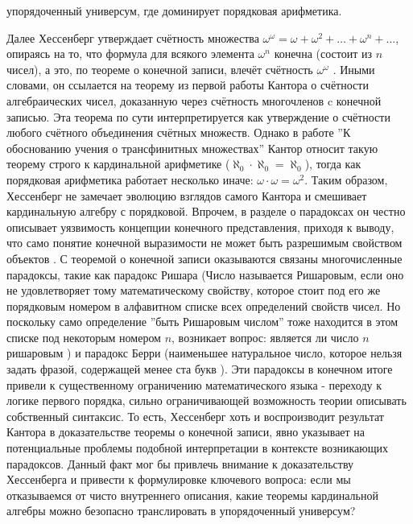 \documentclass[12pt]{article}
\begin{document}
упорядоченный универсум, где доминирует порядковая арифметика.

Далее Хессенберг утверждает счётность множества $\omega^{\omega} = \omega + \omega^2 + \dots + \omega^n + \dots$, опираясь на то, что формула для всякого элемента $\omega^n$ конечна (состоит из $n$ чисел), а это, по теореме о конечной записи, влечёт счётность $\omega^\omega$  \cite{hessenberg-countable-exponent}. Иными словами, он ссылается на теорему из первой работы Кантора о счётности алгебраических чисел, доказанную через счётность многочленов c конечной записью. Эта теорема по сути интерпретируется как утверждение о счётности любого счётного объединения счётных множеств. Однако в работе ''К обоснованию учения о трансфинитных множествах'' Кантор относит такую теорему строго к кардинальной арифметике ($\aleph_0 \cdot \aleph_0 = \aleph_0$), тогда как порядковая арифметика работает несколько иначе: $\omega \cdot \omega = \omega^2$. Таким образом, Хессенберг не замечает эволюцию взглядов самого Кантора и смешивает кардинальную алгебру с порядковой. Впрочем, в разделе о парадоксах он честно описывает уязвимость концепции конечного представления, приходя к выводу, что само понятие конечной выразимости не может быть разрешимым свойством объектов \cite{hessenberg-paradoxes}. С теоремой о конечной записи оказываются связаны многочисленные парадоксы, такие как парадокс Ришара (Число называется Ришаровым, если оно не удовлетворяет тому математическому свойству, которое стоит под его же порядковым номером в алфавитном списке всех определений свойств чисел. Но поскольку само определение ''быть Ришаровым числом'' тоже находится в этом списке под некоторым номером $n$, возникает вопрос: является ли число $n$ ришаровым \cite{richard-paradox}) и парадокс Берри (наименьшее натуральное число, которое нельзя задать фразой, содержащей менее ста букв \cite{berry-paradox}). Эти парадоксы в конечном итоге привели к существенному ограничению математического языка - переходу к логике первого порядка, сильно ограничивающей возможность теории описывать собственный синтаксис. То есть, Хессенберг хоть и воспроизводит результат Кантора в доказательстве теоремы о конечной записи, явно указывает на потенциальные проблемы подобной интерпретации в контексте возникающих парадоксов. Данный факт мог бы привлечь внимание к доказательству Хессенберга и привести к формулировке ключевого вопроса: если мы отказываемся от чисто внутреннего описания, какие теоремы кардинальной алгебры можно безопасно транслировать в упорядоченный универсум? 
\end{document}
